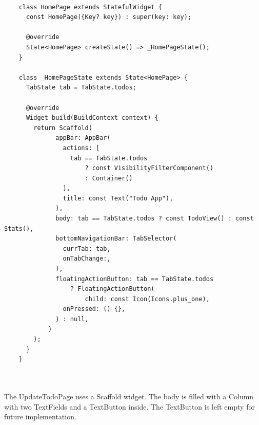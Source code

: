 	\mbox{}\\
	\begin{code}
	 \mbox{}
			\label{code:2.6}

	\begin{verbatim}
	class HomePage extends StatefulWidget {
	  const HomePage({Key? key}) : super(key: key);
	
	  @override
	  State<HomePage> createState() => _HomePageState();
	}
	
	class _HomePageState extends State<HomePage> {
	  TabState tab = TabState.todos; 
	
	  @override
	  Widget build(BuildContext context) {
	    return Scaffold(
	          appBar: AppBar(
	            actions: [
	              tab == TabState.todos
	                  ? const VisibilityFilterComponent()
	                  : Container()
	            ],
	            title: const Text("Todo App"),
	          ),
	          body: tab == TabState.todos ? const TodoView() : const Stats(),
	          bottomNavigationBar: TabSelector(
	            currTab: tab,
	            onTabChange:,
	          ),
	          floatingActionButton: tab == TabState.todos
	              ? FloatingActionButton(
	                  child: const Icon(Icons.plus_one),
	            onPressed: () {},
	          ) : null,
	        )
	    );
	  }
	}
	
	
	\end{verbatim}
	\end{code}
	\mbox{}
	
	
	The UpdateTodoPage uses a Scaffold widget. The body is filled with a Column with two TextFields and a TextButton inside. The TextButton is left empty for future implementation.
	

